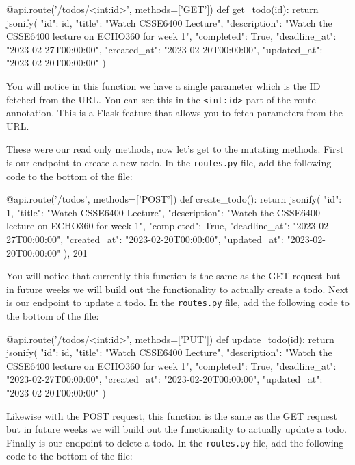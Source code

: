 \documentclass{csse4400}
\begin{document}
\begin{code}[language=python]{}
  @api.route('/todos/<int:id>', methods=['GET'])
  def get_todo(id):
      return jsonify({
        "id": id,
        "title": "Watch CSSE6400 Lecture",
        "description": "Watch the CSSE6400 lecture on ECHO360 for week 1",
        "completed": True,
        "deadline_at": "2023-02-27T00:00:00",
        "created_at": "2023-02-20T00:00:00",
        "updated_at": "2023-02-20T00:00:00"
      })
\end{code}

You will notice in this function we have a single parameter which is the ID fetched from the URL. You can see this in the \texttt{<int:id>} part of the route annotation. This is a Flask feature that allows you to fetch parameters from the URL. 

These were our read only methods, now let's get to the mutating methods. First is our endpoint to create a new todo. In the \texttt{routes.py} file, add the following code to the bottom of the file:

\begin{code}[language=python]{}
  @api.route('/todos', methods=['POST'])
  def create_todo():
      return jsonify({
        "id": 1,
        "title": "Watch CSSE6400 Lecture",
        "description": "Watch the CSSE6400 lecture on ECHO360 for week 1",
        "completed": True,
        "deadline_at": "2023-02-27T00:00:00",
        "created_at": "2023-02-20T00:00:00",
        "updated_at": "2023-02-20T00:00:00"
      }), 201
\end{code}

You will notice that currently this function is the same as the GET request but in future weeks we will build out the functionality to actually create a todo. Next is our endpoint to update a todo. In the \texttt{routes.py} file, add the following code to the bottom of the file:

\begin{code}[language=python]{}
  @api.route('/todos/<int:id>', methods=['PUT'])
  def update_todo(id):
      return jsonify({
        "id": id,
        "title": "Watch CSSE6400 Lecture",
        "description": "Watch the CSSE6400 lecture on ECHO360 for week 1",
        "completed": True,
        "deadline_at": "2023-02-27T00:00:00",
        "created_at": "2023-02-20T00:00:00",
        "updated_at": "2023-02-20T00:00:00"
      })
\end{code}

Likewise with the POST request, this function is the same as the GET request but in future weeks we will build out the functionality to actually update a todo. Finally is our endpoint to delete a todo. In the \texttt{routes.py} file, add the following code to the bottom of the file:
\end{document}
